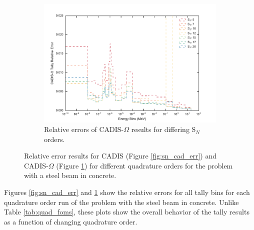 \begin{figure}[htb!]\ContinuedFloat
  \centering
  \begin{subfigure}[t]{\textwidth}
    \centering
    \includegraphics[width=\linewidth]{./chapters/characterization_probs/figures/angle/prob_1/err_quad_cadisangle.pdf}
    \caption{Relative errors of CADIS-$\Omega$ results for differing S$_N$
    orders.}
    \label{fig:sn_cadangle_err}
  \end{subfigure}
  \caption[Relative error results for CADIS and CADIS-$\Omega$ for different
  quadrature orders for the problem with a steel beam in concrete.]
  {Relative error results for CADIS (Figure \ref{fig:sn_cad_err})
  and CADIS-$\Omega$ (Figure \ref{fig:sn_cadangle_err}) for different
  quadrature orders for the problem with a steel beam in concrete.}
  \label{fig:sn_errs}
\end{figure}

Figures \ref{fig:sn_cad_err} and \ref{fig:sn_cadangle_err} show the relative
errors for all tally bins for each quadrature order run of the problem with the
steel beam in concrete. Unlike Table \ref{tab:quad_foms}, these plots show the
overall behavior of the tally results as a function of changing quadrature
order.

